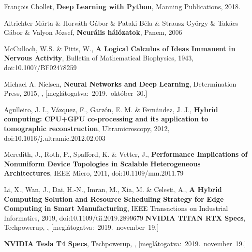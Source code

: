 \begin{thebibliography}{9}
	François Chollet,
	\textbf{Deep Learning with Python},
	Manning Publications,
	2018.

	Altrichter Márta \& Horváth Gábor \& Pataki Béla \& Strausz György \& Takács Gábor \& Valyon József,
	\textbf{Neurális hálózatok},
	Panem,
	2006

	McCulloch, W.S. \& Pitts, W.,
	\textbf{A Logical Calculus of Ideas Immanent in Nervous Activity},
	Bulletin of Mathematical Biophysics,
	1943,
	doi:10.1007/BF02478259

	Michael A. Nielsen,
	\textbf{Neural Networks and Deep Learning},
	Determination Press,
	2015,
	,
	\mbox{[meglátogatva:~2019.~október~30.]}

	Agulleiro, J. I., Vázquez, F., Garzón, E. M. \& Fernández, J. J., \textbf{Hybrid computing: CPU+GPU co-processing and its application to tomographic reconstruction},
	Ultramicroscopy,
	2012,
	doi:10.1016/j.ultramic.2012.02.003 

	Meredith, J., Roth, P., Spafford, K. \& Vetter, J.,
	\textbf{Performance Implications of Nonuniform Device Topologies in Scalable Heterogeneous Architectures},
	IEEE Micro,
	2011,
	doi:10.1109/mm.2011.79 

	Li, X., Wan, J., Dai, H.-N., Imran, M., Xia, M. \& Celesti, A.,
	\textbf{A Hybrid Computing Solution and Resource Scheduling Strategy for Edge Computing in Smart Manufacturing},
	IEEE Transactions on Industrial Informatics,
	2019,
	doi:10.1109/tii.2019.2899679
	\textbf{NVIDIA TITAN RTX Specs},
	Techpowerup,
	,
	\mbox{[meglátogatva:~2019.~november~19.]}

	\textbf{NVIDIA Tesla T4 Specs},
	Techpowerup,
	,
	\mbox{[meglátogatva:~2019.~november~19.]}



\end{thebibliography}
